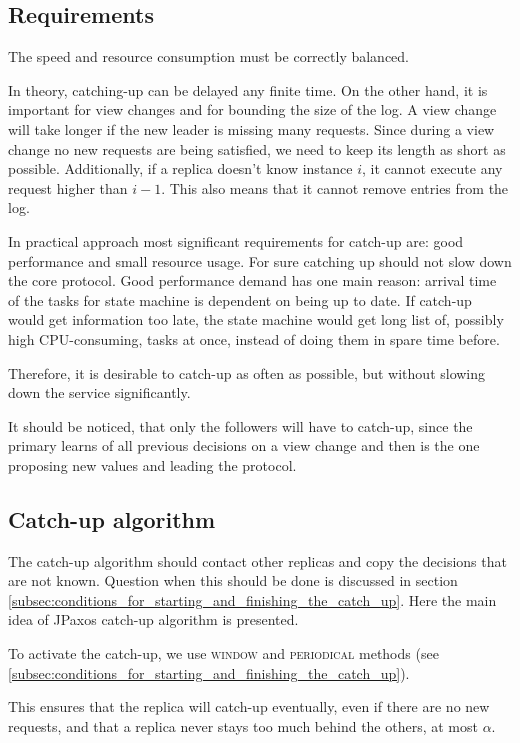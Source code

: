 \subsection{Requirements}
\label{subsec:catch_up_requirements}
The speed and resource consumption must be correctly balanced.

In theory, catching-up can be delayed any finite time. On the other hand, it is important for view changes and for bounding the size of the log. A view change will take longer if the new leader is missing many requests. Since during a view change no new requests are being satisfied, we need to keep its length as short as possible. Additionally, if a replica doesn't know instance $i$, it cannot execute any request higher than $i-1$. This also means that it cannot remove entries from the log.

In practical approach most significant requirements for catch-up are: good performance and small resource usage. For sure catching up should not slow down the core protocol.
Good performance demand has one main reason: arrival time of the tasks for state machine is dependent on being up to date. If catch-up would get information too late, the state machine would get long list of, possibly high CPU-consuming, tasks at once, instead of doing them in spare time before.

Therefore, it is desirable to catch-up as often as possible, but without slowing down the service significantly.

It should be noticed, that only the followers will have to catch-up, since the primary learns of all previous decisions on a view change and then is the one proposing new values and leading the protocol.

\subsection{Catch-up algorithm}
\label{subsec:catch_up_algorithm}
The catch-up algorithm should contact other replicas and copy the decisions that are not known. Question when this should be done is discussed in section \ref{subsec:conditions_for_starting_and_finishing_the_catch_up}. Here the main idea of JPaxos catch-up algorithm is presented.

To activate the catch-up, we use \textsc{window} and \textsc{periodical} methods (see \ref{subsec:conditions_for_starting_and_finishing_the_catch_up}).

This ensures that the replica will catch-up eventually, even if there are no new requests, and that a replica never stays too much behind the others, at most $\alpha$.

